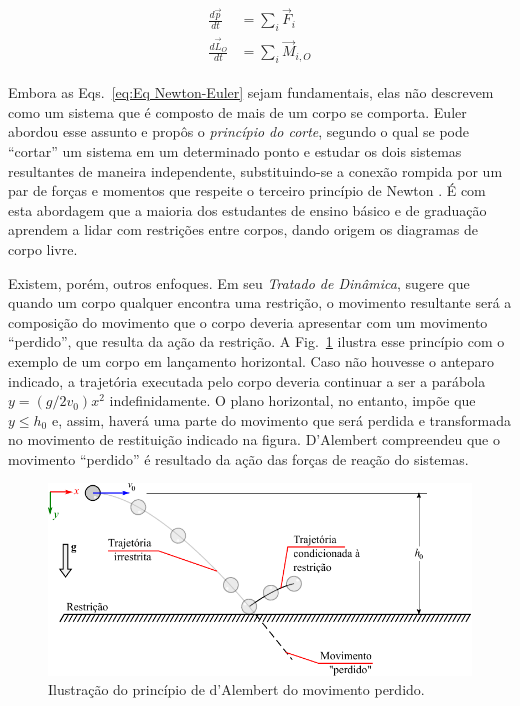 \begin{align}
\begin{split}
 \frac{d\vec{p}}{dt} &= \sum_i{\vec{F}_i} \\
 \frac{d\vec{L}_O}{dt} &= \sum_i{\vec{M}_{i,O}}
\end{split}
\label{eq:Eq Newton-Euler}
\end{align}

Embora as Eqs.~\eqref{eq:Eq Newton-Euler} sejam fundamentais, elas não descrevem como um sistema que é composto de mais de um corpo se comporta. Euler abordou esse assunto e propôs o \textit{princípio do corte}, segundo o qual se pode ``cortar'' um sistema em um determinado ponto e estudar os dois sistemas resultantes de maneira independente, substituindo-se a conexão rompida por um par de forças e momentos que respeite o terceiro princípio de Newton \cite[p. 6-7]{pfeiffer_mechanical_2005}. É com esta abordagem que a maioria dos estudantes de ensino básico e de graduação aprendem a lidar com restrições entre corpos, dando origem os diagramas de corpo livre.

Existem, porém, outros enfoques. Em seu \textit{Tratado de Dinâmica},  sugere que quando um corpo qualquer encontra uma restrição, o movimento resultante será a composição do movimento que o corpo deveria apresentar com um movimento ``perdido'', que resulta da ação da restrição. A Fig.~\ref{fig:d'Alembert} ilustra esse princípio com o exemplo de um corpo em lançamento horizontal. Caso não houvesse o anteparo indicado, a trajetória executada pelo corpo deveria continuar a ser a parábola $y = (g/2v_0)x^2$ indefinidamente. O plano horizontal, no entanto, impõe que $y\leq{h_0}$ e, assim, haverá uma parte do movimento que será perdida e transformada no movimento de restituição indicado na figura. D'Alembert compreendeu que o movimento ``perdido'' é resultado da ação das forças de reação do sistemas.

\begin{figure}[htp]
 \centering
 \includegraphics{Cap_2/Figuras/dalembert.pdf}
 \caption{Ilustração do princípio de d'Alembert do movimento perdido.}
 \label{fig:d'Alembert}
\end{figure}


